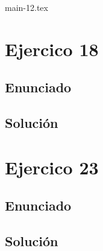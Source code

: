 \documentclass[a4paper,12pt]{article}
\begin{document}
\tableofcontents

%
%
%
%

{main-12.tex}



\newpage
\section{Ejercico 18}
\subsection{Enunciado}
\subsection{Solución}

\newpage
\section{Ejercico 23}
\subsection{Enunciado}
\subsection{Solución}
\end{document}
